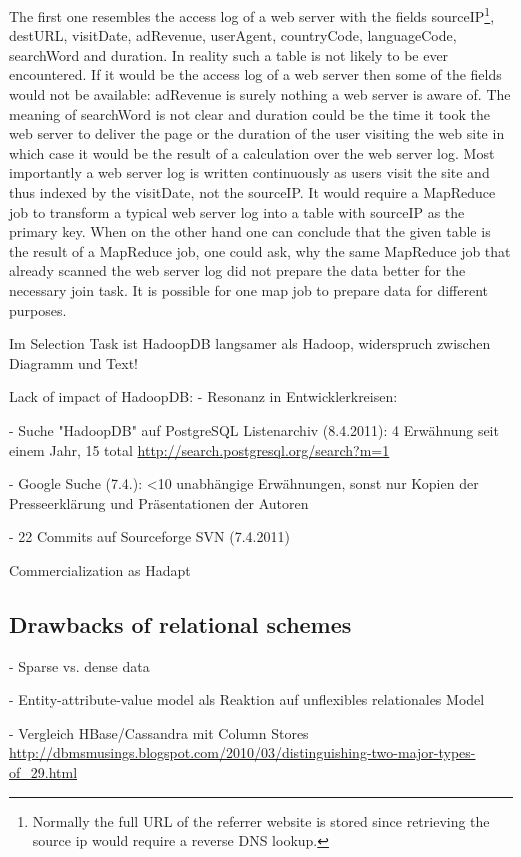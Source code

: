 \documentclass[12pt,a4paper]{scrartcl}		%
\begin{document}
The first one resembles the access log of a web server with the fields sourceIP\footnote{Normally the full URL of the referrer website is stored since retrieving the source ip would require a reverse DNS lookup.}, destURL, visitDate, adRevenue, userAgent, countryCode, languageCode, searchWord and duration. In reality such a table is not likely to be ever encountered. If it would be the access log of a web server then some of the fields would not be available: adRevenue is surely nothing a web server is aware of. The meaning of searchWord is not clear and duration could be the time it took the web server to deliver the page or the duration of the user visiting the web site in which case it would be the result of a calculation over the web server log. Most importantly a web server log is written continuously as users visit the site and thus indexed by the visitDate, not the sourceIP. It would require a MapReduce job to transform a typical web server log into a table with sourceIP as the primary key.
When on the other hand one can conclude that the given table is the result of a MapReduce job, one could ask, why the same MapReduce job that already scanned the web server log did not prepare the data better for the necessary join task. It is possible for one map job to prepare data for different purposes.




Im Selection Task ist HadoopDB langsamer als Hadoop, widerspruch zwischen Diagramm und Text!




Lack of impact of HadoopDB:
  - Resonanz in Entwicklerkreisen:

    - Suche "HadoopDB" auf PostgreSQL Listenarchiv (8.4.2011): 4 Erwähnung seit einem Jahr, 15 total
      \url{http://search.postgresql.org/search?m=1}

    - Google Suche (7.4.): <10 unabhängige Erwähnungen, sonst nur Kopien der Presseerklärung und Präsentationen der Autoren

    - 22 Commits auf Sourceforge SVN (7.4.2011)

Commercialization as Hadapt

\subsection{Drawbacks of relational schemes}
  - Sparse vs. dense data

  - Entity-attribute-value model als Reaktion auf unflexibles relationales Model

  - Vergleich HBase/Cassandra mit Column Stores
    \url{http://dbmsmusings.blogspot.com/2010/03/distinguishing-two-major-types-of_29.html}
\end{document}
